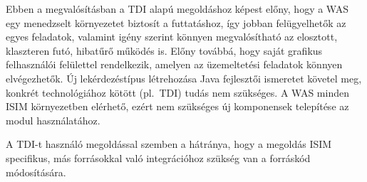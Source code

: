 Ebben a megvalósításban a TDI alapú megoldáshoz képest előny, hogy a WAS egy menedzselt környezetet biztosít a futtatáshoz, így jobban felügyelhetők az egyes feladatok, valamint igény szerint könnyen megvalósítható az elosztott, klaszteren futó, hibatűrő működés is. Előny továbbá, hogy saját grafikus felhasználói felülettel rendelkezik, amelyen az üzemeltetési feladatok könnyen elvégezhetők. Új lekérdezéstípus létrehozása Java fejlesztői ismeretet követel meg, konkrét technológiához kötött (pl.~TDI) tudás nem szükséges. A WAS minden ISIM környezetben elérhető, ezért nem szükséges új komponensek telepítése az modul használatához.

A TDI-t használó megoldással szemben a hátránya, hogy a megoldás ISIM specifikus, más forrásokkal való integrációhoz szükség van a forráskód módosítására.
